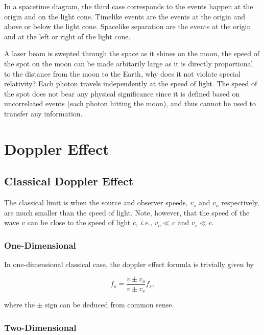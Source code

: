 \documentclass[english,a4paper,12pt]{report}
\begin{document}
In a spacetime diagram, the third case corresponds to the events happen at the origin and on the light cone. Timelike events are the events at the origin and above or below the light cone. Spacelike separation are the events at the origin and at the left or right of the light cone.


{A laser beam is swepted through the space as it shines on the moon, the speed of the spot on the moon can be made arbitarily large as it is directly proportional to the distance from the moon to the Earth, why does it not violate special relativity?}
{Each photon travels independently at the speed of light. The speed of the spot does not bear any physical significance since it is defined based on uncorrelated events (each photon hitting the moon), and thus cannot be used to transfer any information.} 


\section{Doppler Effect}

\subsection{Classical Doppler Effect}

The classical limit is when the source and observer speeds, \(v_{s}\text { and } v_{o}  \) respectively, are much smaller than the speed of light. Note, however, that the speed of the wave \(v\) can be close to the speed of light \(c\), \textit{i.e.,} \(v_{o} \ll c \text { and } v_{s} \ll c  \). 

\subsubsection{One-Dimensional}

In one-dimensional classical case, the doppler effect formula is trivially given by

\begin{equation}
    f_{o} = \frac{v \pm v_{o} }{v \pm v_{s} } f_{s},  
\end{equation}

where the \(\pm \) sign can be deduced from common sense.

\subsubsection{Two-Dimensional}
\end{document}

